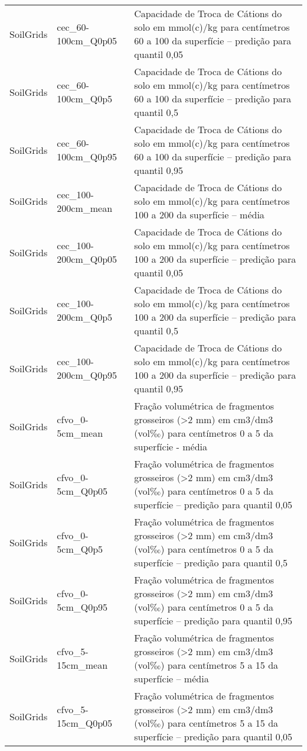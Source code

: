 \begin{longtable}{@{} p{4cm} p{4cm} p{8cm} @{}}
	SoilGrids &
	cec\_60-100cm\_Q0p05 &
	Capacidade de Troca de Cátions do solo em mmol(c)/kg para centímetros 60 a 100 da superfície – predição para quantil 0,05 \\
	SoilGrids &
	cec\_60-100cm\_Q0p5 &
	Capacidade de Troca de Cátions do solo em mmol(c)/kg para centímetros 60 a 100 da superfície – predição para quantil 0,5 \\
	SoilGrids &
	cec\_60-100cm\_Q0p95 &
	Capacidade de Troca de Cátions do solo em mmol(c)/kg para centímetros 60 a 100 da superfície – predição para quantil 0,95 \\
	SoilGrids &
	cec\_100-200cm\_mean &
	Capacidade de Troca de Cátions do solo em mmol(c)/kg para centímetros 100 a 200 da superfície – média \\
	SoilGrids &
	cec\_100-200cm\_Q0p05 &
	Capacidade de Troca de Cátions do solo em mmol(c)/kg para centímetros 100 a 200 da superfície – predição para quantil 0,05 \\
	SoilGrids &
	cec\_100-200cm\_Q0p5 &
	Capacidade de Troca de Cátions do solo em mmol(c)/kg para centímetros 100 a 200 da superfície – predição para quantil 0,5 \\
	SoilGrids &
	cec\_100-200cm\_Q0p95 &
	Capacidade de Troca de Cátions do solo em mmol(c)/kg para centímetros 100 a 200 da superfície – predição para quantil 0,95 \\
	SoilGrids &
	cfvo\_0-5cm\_mean &
	Fração volumétrica de fragmentos grosseiros (\textgreater 2 mm) em cm3/dm3 (vol‰) para centímetros 0 a 5 da superfície - média \\
	SoilGrids &
	cfvo\_0-5cm\_Q0p05 &
	Fração volumétrica de fragmentos grosseiros (\textgreater 2 mm) em cm3/dm3 (vol‰) para centímetros 0 a 5 da superfície – predição para quantil 0,05 \\
	SoilGrids &
	cfvo\_0-5cm\_Q0p5 &
	Fração volumétrica de fragmentos grosseiros (\textgreater 2 mm) em cm3/dm3 (vol‰) para centímetros 0 a 5 da superfície – predição para quantil 0,5 \\
	SoilGrids &
	cfvo\_0-5cm\_Q0p95 &
	Fração volumétrica de fragmentos grosseiros (\textgreater 2 mm) em cm3/dm3 (vol‰) para centímetros 0 a 5 da superfície – predição para quantil 0,95 \\
	SoilGrids &
	cfvo\_5-15cm\_mean &
	Fração volumétrica de fragmentos grosseiros (\textgreater 2 mm) em cm3/dm3 (vol‰) para centímetros 5 a 15 da superfície – média \\
	SoilGrids &
	cfvo\_5-15cm\_Q0p05 &
	Fração volumétrica de fragmentos grosseiros (\textgreater 2 mm) em cm3/dm3 (vol‰) para centímetros 5 a 15 da superfície – predição para quantil 0,05 \\

\end{longtable}
